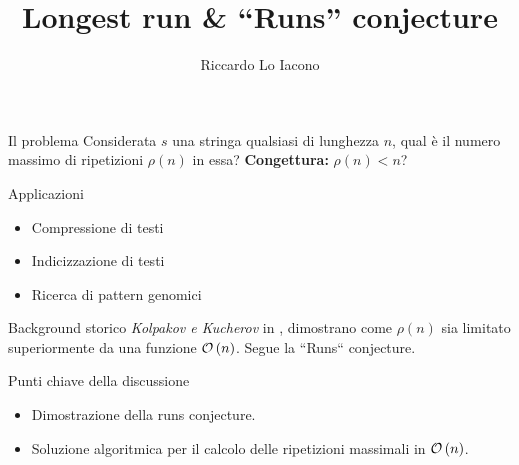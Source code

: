 \documentclass{beamer}
\title{Longest run \& ``Runs'' conjecture}
\author{Riccardo Lo Iacono}
\begin{document}
    \begin{frame}
        \maketitle
    \end{frame}

    \begin{frame}{Il problema}
        Considerata \(s\) una stringa qualsiasi di lunghezza \(n\),
        qual è il numero massimo di ripetizioni \(\rho (n)\) in essa?
        \vskip 10pt
        \textbf{Congettura: } \(\rho (n) < n\)?
    \end{frame}
    
    \begin{frame}{Applicazioni}
        \begin{itemize}
            \item Compressione di testi
            \item Indicizzazione di testi
            \item Ricerca di pattern genomici\footnotemark[1]
        \end{itemize}

    \end{frame}
        
    \begin{frame}{Background storico}
        \emph{Kolpakov \emph{e} Kucherov} in \cite{KolpakovKuckerov},
        dimostrano come \(\rho(n)\) sia limitato superiormente 
        da una funzione \(\mathcal{O} \left\lparen n \right\rparen\).
        \vskip 15pt 
        Segue la ``Runs`` conjecture.
    \end{frame}

    \begin{frame}{Punti chiave della discussione}
        \begin{itemize}
            \item Dimostrazione della runs conjecture.
            \item Soluzione algoritmica per il calcolo delle ripetizioni 
                massimali in \(\mathcal{O} \left\lparen n \right\rparen\).
        \end{itemize}
    \end{frame}
\end{document}
